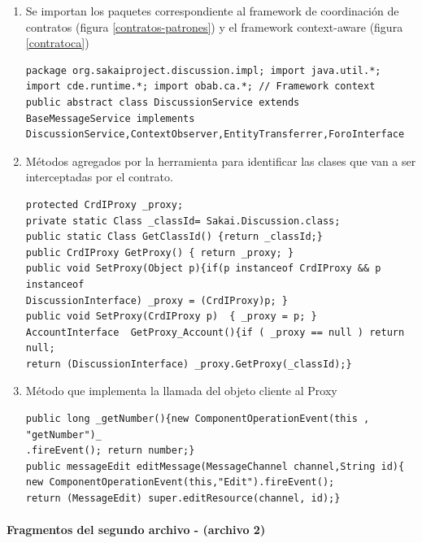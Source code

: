 \begin{enumerate}
 \item Se importan los paquetes correspondiente al framework de coordinación de
contratos (figura \ref{contratos-patrones}) y el framework context-aware (figura
\ref{contratoca})

\small \begin{verbatim}
package org.sakaiproject.discussion.impl; import java.util.*;
import cde.runtime.*; import obab.ca.*; // Framework context
public abstract class DiscussionService extends 
BaseMessageService implements 
DiscussionService,ContextObserver,EntityTransferrer,ForoInterface
\end{verbatim} \normalsize

\item  Métodos agregados por la herramienta para identificar las clases que van a ser interceptadas por el contrato.

\small \begin{verbatim}
protected CrdIProxy _proxy; 
private static Class _classId= Sakai.Discussion.class;
public static Class GetClassId() {return _classId;}
public CrdIProxy GetProxy() { return _proxy; }
public void SetProxy(Object p){if(p instanceof CrdIProxy && p instanceof 
DiscussionInterface) _proxy = (CrdIProxy)p; }
public void SetProxy(CrdIProxy p)  { _proxy = p; }
AccountInterface  GetProxy_Account(){if ( _proxy == null ) return null;  
return (DiscussionInterface) _proxy.GetProxy(_classId);}
\end{verbatim} \normalsize

\item Método que implementa la llamada del objeto cliente al Proxy

\small \begin{verbatim}
public long _getNumber(){new ComponentOperationEvent(this , "getNumber")_
.fireEvent(); return number;}
public messageEdit editMessage(MessageChannel channel,String id)‏{
new ComponentOperationEvent(this,"Edit").fireEvent();
return (MessageEdit) super.editResource(channel, id);}
\end{verbatim} \normalsize


\end{enumerate}

\paragraph {Fragmentos del segundo archivo - (archivo 2)}

